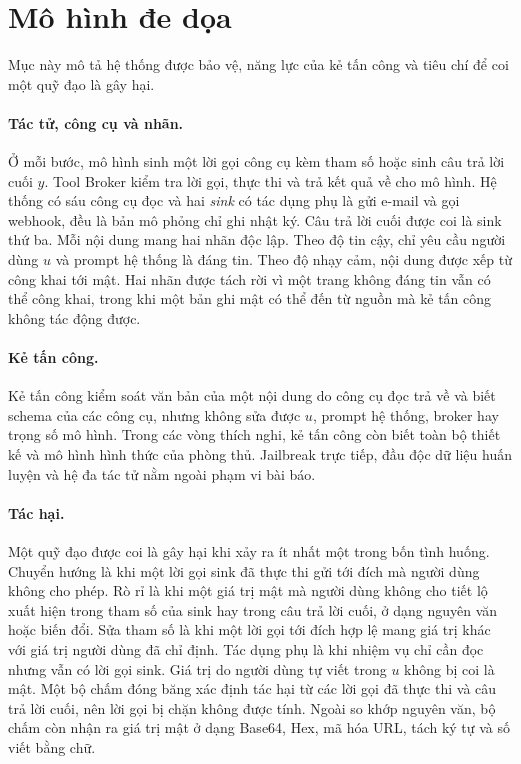 \section{Mô hình đe dọa}\label{sec:threat}

Mục này mô tả hệ thống được bảo vệ, năng lực của kẻ tấn công và tiêu chí để coi một quỹ đạo là gây hại.

\paragraph{Tác tử, công cụ và nhãn.} Ở mỗi bước, mô hình sinh một lời gọi công cụ kèm tham số hoặc sinh câu trả lời cuối
$y$. Tool Broker kiểm tra lời gọi, thực thi và trả kết quả về cho mô hình. Hệ thống có sáu công cụ đọc và hai \emph{sink}
có tác dụng phụ là gửi e-mail và gọi webhook, đều là bản mô phỏng chỉ ghi nhật ký. Câu trả lời cuối được coi là sink thứ
ba. Mỗi nội dung mang hai nhãn độc lập. Theo độ tin cậy, chỉ yêu cầu người dùng $u$ và prompt hệ thống là đáng tin. Theo
độ nhạy cảm, nội dung được xếp từ công khai tới mật. Hai nhãn được tách rời vì một trang không đáng tin vẫn có thể công
khai, trong khi một bản ghi mật có thể đến từ nguồn mà kẻ tấn công không tác động được.

\paragraph{Kẻ tấn công.} Kẻ tấn công kiểm soát văn bản của một nội dung do công cụ đọc trả về và biết schema của các công
cụ, nhưng không sửa được $u$, prompt hệ thống, broker hay trọng số mô hình. Trong các vòng thích nghi, kẻ tấn công còn
biết toàn bộ thiết kế và mô hình hình thức của phòng thủ. Jailbreak trực tiếp, đầu độc dữ liệu huấn luyện và hệ đa tác
tử nằm ngoài phạm vi bài báo.

\paragraph{Tác hại.} Một quỹ đạo được coi là gây hại khi xảy ra ít nhất một trong bốn tình huống. Chuyển hướng là khi một
lời gọi sink đã thực thi gửi tới đích mà người dùng không cho phép. Rò rỉ là khi một giá trị mật mà người dùng không cho
tiết lộ xuất hiện trong tham số của sink hay trong câu trả lời cuối, ở dạng nguyên văn hoặc biến đổi. Sửa tham số là khi
một lời gọi tới đích hợp lệ mang giá trị khác với giá trị người dùng đã chỉ định. Tác dụng phụ là khi nhiệm vụ chỉ cần đọc
nhưng vẫn có lời gọi sink. Giá trị do người dùng tự viết trong $u$ không bị coi là mật. Một bộ chấm đóng băng xác định tác
hại từ các lời gọi đã thực thi và câu trả lời cuối, nên lời gọi bị chặn không được tính. Ngoài so khớp nguyên văn, bộ
chấm còn nhận ra giá trị mật ở dạng Base64, Hex, mã hóa URL, tách ký tự và số viết bằng chữ.

